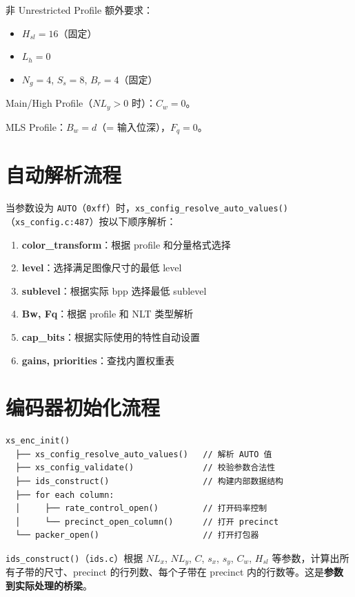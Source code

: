 非 Unrestricted Profile 额外要求：
\begin{itemize}
  \item $H_{sl} = 16$（固定）
  \item $L_h = 0$
  \item $N_g = 4$, $S_s = 8$, $B_r = 4$（固定）
\end{itemize}

Main/High Profile（$NL_y > 0$ 时）：$C_w = 0$。

MLS Profile：$B_w = d$（= 输入位深），$F_q = 0$。

\section{自动解析流程}

当参数设为 \texttt{AUTO}（\texttt{0xff}）时，\texttt{xs\_config\_resolve\_auto\_values()}（\texttt{xs\_config.c:487}）按以下顺序解析：

\begin{enumerate}
  \item \textbf{color\_transform}：根据 profile 和分量格式选择
  \item \textbf{level}：选择满足图像尺寸的最低 level
  \item \textbf{sublevel}：根据实际 bpp 选择最低 sublevel
  \item \textbf{Bw, Fq}：根据 profile 和 NLT 类型解析
  \item \textbf{cap\_bits}：根据实际使用的特性自动设置
  \item \textbf{gains, priorities}：查找内置权重表
\end{enumerate}

\section{编码器初始化流程}

\begin{lstlisting}[numbers=none]
xs_enc_init()
  ├── xs_config_resolve_auto_values()   // 解析 AUTO 值
  ├── xs_config_validate()              // 校验参数合法性
  ├── ids_construct()                   // 构建内部数据结构
  ├── for each column:
  │     ├── rate_control_open()         // 打开码率控制
  │     └── precinct_open_column()      // 打开 precinct
  └── packer_open()                     // 打开打包器
\end{lstlisting}

\texttt{ids\_construct()}（\texttt{ids.c}）根据 $NL_x$, $NL_y$, $C$, $s_x$, $s_y$, $C_w$, $H_{sl}$ 等参数，计算出所有子带的尺寸、precinct 的行列数、每个子带在 precinct 内的行数等。这是\textbf{参数到实际处理的桥梁}。


